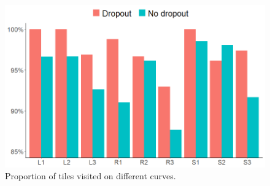 \documentclass{article}
\begin{document}
\begin{figure}[!h]
\hspace{.25cm}
\begin{minipage}[t]{.32\textwidth}
  \centering
  \includegraphics[width=\linewidth]{Graphics/curve_plot_v2.png}
  \caption{Proportion of tiles visited on different curves.}
  \label{fig:curves_comparison}
\end{minipage}
\vspace{-2.5mm}
\end{figure}


\end{document}
